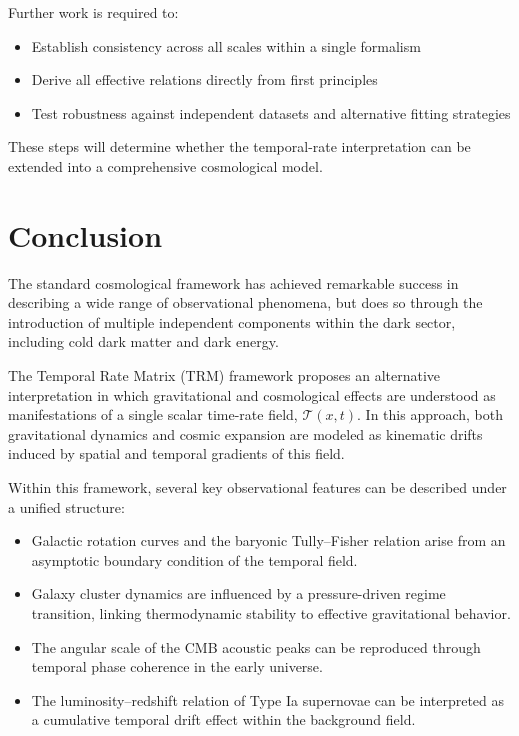 \documentclass[11pt]{article}
\begin{document}
Further work is required to:

\begin{itemize}
	\item Establish consistency across all scales within a single formalism
	\item Derive all effective relations directly from first principles
	\item Test robustness against independent datasets and alternative fitting strategies
\end{itemize}

These steps will determine whether the temporal-rate interpretation can be extended into a comprehensive cosmological model.

\section{Conclusion}

The standard cosmological framework has achieved remarkable success in describing a wide range of observational phenomena, but does so through the introduction of multiple independent components within the dark sector, including cold dark matter and dark energy.

The Temporal Rate Matrix (TRM) framework proposes an alternative interpretation in which gravitational and cosmological effects are understood as manifestations of a single scalar time-rate field, $\mathcal{T}(x,t)$. In this approach, both gravitational dynamics and cosmic expansion are modeled as kinematic drifts induced by spatial and temporal gradients of this field.

Within this framework, several key observational features can be described under a unified structure:
\begin{itemize}
	\item Galactic rotation curves and the baryonic Tully--Fisher relation arise from an asymptotic boundary condition of the temporal field.
	\item Galaxy cluster dynamics are influenced by a pressure-driven regime transition, linking thermodynamic stability to effective gravitational behavior.
	\item The angular scale of the CMB acoustic peaks can be reproduced through temporal phase coherence in the early universe.
	\item The luminosity--redshift relation of Type Ia supernovae can be interpreted as a cumulative temporal drift effect within the background field.
\end{itemize}
\end{document}
